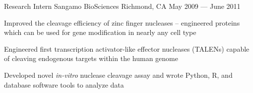 

\begin{cventries}

  \cventry
  {Research Intern} %
  {Sangamo BioSciences} %
  {Richmond, CA} %
  {May 2009 --- June 2011} %
  {
    \begin{cvitems} %
    \item {Improved the cleavage efficiency of zinc finger nucleases – engineered proteins which can be used for gene modification in nearly any cell type}
    \item {Engineered first transcription activator-like effector nucleases (TALENs) capable of cleaving endogenous targets within the human genome}
    \item {Developed novel {\em in-vitro} nuclease cleavage assay and wrote Python, R, and database software tools to analyze data}
    \end{cvitems}
  }


\end{cventries}
